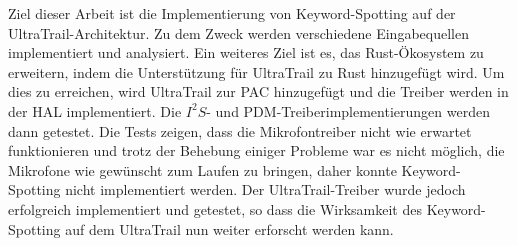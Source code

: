 
Ziel dieser Arbeit ist die Implementierung von Keyword-Spotting auf der UltraTrail-Architektur.
Zu dem Zweck werden verschiedene Eingabequellen implementiert und analysiert.
Ein weiteres Ziel ist es, das Rust-Ökosystem zu erweitern, indem die Unterstützung für UltraTrail zu Rust hinzugefügt wird.
Um dies zu erreichen, wird UltraTrail zur PAC hinzugefügt und die Treiber werden in der HAL implementiert.
Die $I^2S$- und PDM-Treiberimplementierungen werden dann getestet.
Die Tests zeigen, dass die Mikrofontreiber nicht wie erwartet funktionieren und trotz der Behebung einiger Probleme war es nicht möglich, die Mikrofone wie gewünscht zum Laufen zu bringen, daher konnte Keyword-Spotting nicht implementiert werden.
Der UltraTrail-Treiber wurde jedoch erfolgreich implementiert und getestet, so dass
die Wirksamkeit des Keyword-Spotting auf dem UltraTrail nun weiter erforscht werden kann.
